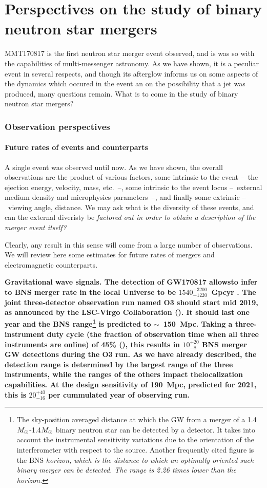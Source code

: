 
\part{Perspectives on the study of binary neutron star mergers}

MMT170817 is the first neutron star merger event observed, and is was so with the capabilities of multi-messenger astronomy. As we have shown, it is a peculiar event in several respects, and though its afterglow informs us on some aspects of the dynamics which occured in the event an on the possibility that a jet was produced, many questions remain. What is to come in the study of binary neutron star mergers?

\section{Observation perspectives}
\subsection{Future rates of events and counterparts}

A single event was observed until now. As we have shown, the overall observations are the product of various factors, some intrinsic to the event --~the ejection energy, velocity, mass, etc.~--, some intrinsic to the event locus --~external medium density and microphysics parameters~--, and finally some extrinsic --~viewing angle, distance. We may ask what is the diversity of these events, and can the external diveristy be \it{factored out} in order to obtain a description of the merger event itself?

Clearly, any result in this sense will come from a large number of observations. We will review here some estimates for future rates of mergers and electromagnetic counterparts.

\bf{Gravitational wave signals.} The detection of GW170817 allowsto infer to BNS merger rate in the local Universe to be $1540^{+3200}_{-1220}$~Gpcyr \cite{37}. The joint three-detector observation run named O3 should start mid 2019, as announced by the LSC-Virgo Collaboration (\cite{54}). It should last one year and the BNS range\footnote{The sky-position averaged distance at which the GW from a merger of a 1.4$M_{\odot}$-1.4$M_{\odot}$ binary neutron star can be detected by a detector. It takes into account the instrumental sensitivity variations due to the orientation of the interferometer with respect to the source. Another frequently cited figure is the BNS \it{horizon}, which is the distance to which an  optimally oriented such binary merger can be detected. The range is 2.26 times lower than the horizon.} is predicted to $\sim$~150~Mpc. Taking a three-instrument duty cycle (the fraction of observation time when all three instruments are online) of 45\% (\cite{54}), this results in $10^{+20}_{-8}$ BNS merger GW detections during the O3 run. As we have already described, the detection range is determined by the largest range of the three instruments, while the ranges of the others impact thelocalization capabilities.
At the design sensitivity of 190~Mpc, predicted for 2021, this is $20^{+40}_{-16}$ per cummulated year of observing run.

